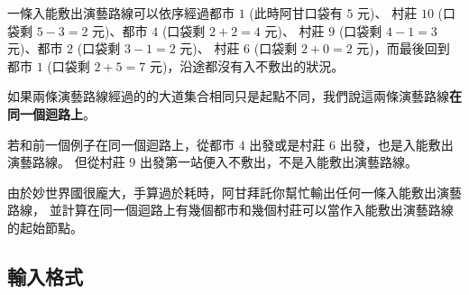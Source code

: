 一條入能敷出演藝路線可以依序經過都市 \begin{math}1\end{math}
(此時阿甘口袋有 \begin{math}5\end{math} 元)、 村莊
\begin{math}10\end{math} (口袋剩 \begin{math}5-3 = 2\end{math} 元)、都市
\begin{math}4\end{math} (口袋剩 \begin{math}2+2 = 4\end{math} 元)、 村莊
\begin{math}9\end{math} (口袋剩 \begin{math}4-1 = 3\end{math} 元)、都市
\begin{math}2\end{math} (口袋剩 \begin{math}3-1 = 2\end{math} 元)、 村莊
\begin{math}6\end{math} (口袋剩 \begin{math}2+0 = 2\end{math}
元)，而最後回到都市 \begin{math}1\end{math} (口袋剩
\begin{math}2+5 = 7\end{math} 元)，沿途都沒有入不敷出的狀況。

如果兩條演藝路線經過的的大道集合相同只是起點不同，我們說這兩條演藝路線\textbf{在同一個迴路上}。

若和前一個例子在同一個迴路上，從都市 \begin{math}4\end{math}
出發或是村莊 \begin{math}6\end{math} 出發，也是入能敷出演藝路線。
但從村莊 \begin{math}9\end{math}
出發第一站便入不敷出，不是入能敷出演藝路線。

由於妙世界國很龐大，手算過於耗時，阿甘拜託你幫忙輸出任何一條入能敷出演藝路線，
並計算在同一個迴路上有幾個都市和幾個村莊可以當作入能敷出演藝路線的起始節點。

\subsection{輸入格式}

